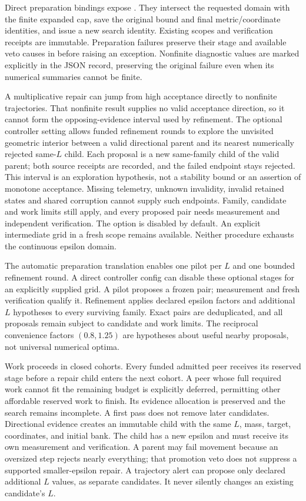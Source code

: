 Direct preparation bindings expose .
They intersect the requested domain with the finite expanded cap, save the
original bound and final metric/coordinate identities, and issue a new search
identity. Existing scopes and verification receipts are immutable. Preparation
failures preserve their stage and available veto causes in
 before raising an exception.
Nonfinite diagnostic values are marked explicitly in the JSON record, preserving
the original failure even when its numerical summaries cannot be finite.

A multiplicative repair can jump from high acceptance directly to nonfinite
trajectories. That nonfinite result supplies no valid acceptance direction,
so it cannot form the opposing-evidence interval used by refinement. The optional
 controller setting allows funded refinement
rounds to explore the unvisited geometric interior between a valid directional
parent and its nearest numerically rejected same-$L$ child. Each proposal is a
new same-family child of the valid parent; both source receipts are recorded,
and the failed endpoint stays rejected. This interval is an exploration
hypothesis, not a stability bound or an assertion of monotone acceptance.
Missing telemetry, unknown invalidity, invalid retained states and shared
corruption cannot supply such endpoints. Family, candidate and work limits
still apply, and every proposed pair needs measurement and independent
verification. The option is disabled by default. An explicit intermediate grid
in a fresh scope remains available. Neither procedure exhausts the continuous
epsilon domain.

The automatic preparation translation enables one pilot per $L$ and one bounded
refinement round. A direct controller config can disable these optional stages
for an explicitly supplied grid. A pilot proposes a frozen pair; measurement
and fresh verification qualify it. Refinement applies declared epsilon factors
and additional $L$ hypotheses to every surviving family. Exact pairs are
deduplicated, and all proposals remain subject to candidate and work limits.
The reciprocal convenience factors $(0.8,1.25)$ are hypotheses about useful
nearby proposals, not universal numerical optima.

Work proceeds in closed cohorts. Every funded admitted peer receives its reserved
stage before a repair child enters the next cohort. A peer whose full required
work cannot fit the remaining budget is explicitly deferred, permitting other
affordable reserved work to finish. Its evidence allocation is preserved and
the search remains incomplete. A first pass does not
remove later candidates. Directional evidence creates an immutable child with
the same $L$, mass, target, coordinates, and initial bank. The child has a new
epsilon and must receive its own measurement and verification. A parent may
fail movement because an oversized step rejects nearly everything; that
promotion veto does not suppress a supported smaller-epsilon repair.
A trajectory alert can propose only declared additional $L$ values, as separate
candidates. It never silently changes an existing candidate's $L$.

